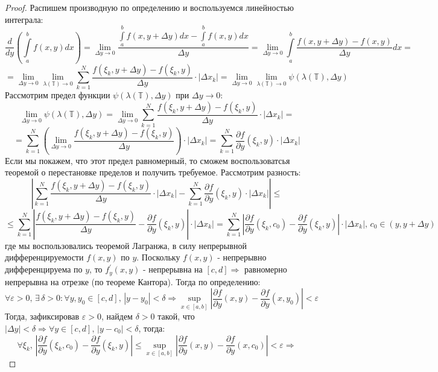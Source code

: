 \documentclass[12pt]{article}
\newcommand{\MTB}{\mathbb{T}}
\newcommand{\VE}{\varepsilon}
\theoremstyle{definition}
\newcommand{\ddsum}[2]{\displaystyle\sum\limits_{#1}^{#2}}
\newcommand{\ddint}[2]{\displaystyle\int\limits_{#1}^{#2}}
\begin{document}
\begin{proof}
	Распишем производную по определению и воспользуемся линейностью интеграла:
	$$
		\dfrac{d}{dy}\left(\ddint{a}{b}f(x,y)dx\right) = \lim\limits_{\Delta y \to 0}\dfrac{\ddint{a}{b}f(x, y + \Delta y)dx - \ddint{a}{b}f(x,y)dx}{\Delta y} = \lim\limits_{\Delta y \to 0}\ddint{a}{b}\dfrac{f(x, y + \Delta y) - f(x,y)}{\Delta y} dx =
	$$
	$$
		= \lim\limits_{\Delta y \to 0}\lim\limits_{\lambda(\MTB)\to 0}\ddsum{k = 1}{N}\dfrac{f(\xi_k, y + \Delta y) - f(\xi_k, y)}{\Delta y}{\cdot}|\Delta x_k| = \lim\limits_{\Delta y \to 0}\lim\limits_{\lambda(\MTB)\to 0}\psi\left(\lambda(\MTB) , \Delta y\right)
	$$
	Рассмотрим предел функции $\psi(\lambda(\MTB) , \Delta y)$ при $\Delta y \to 0$:
	$$
		\lim\limits_{\Delta y \to 0}\psi(\lambda(\MTB) , \Delta y) = \lim\limits_{\Delta y \to 0}\ddsum{k = 1}{N}\dfrac{f(\xi_k, y + \Delta y) - f(\xi_k, y)}{\Delta y}{\cdot}|\Delta x_k| = 
	$$
	$$
		= \ddsum{k = 1}{N}\left(\lim\limits_{\Delta y \to 0}\dfrac{f(\xi_k, y + \Delta y) - f(\xi_k, y)}{\Delta y} \right){\cdot}|\Delta x_k| = \ddsum{k = 1}{N}\dfrac{\partial f}{\partial y}(\xi_k, y){\cdot}|\Delta x_k|
	$$
	Если мы покажем, что этот предел равномерный, то сможем воспользоватсья теоремой о перестановке пределов и получить требуемое. Рассмотрим разность:
	$$
		\left|\ddsum{k = 1}{N}\dfrac{f(\xi_k, y+\Delta y) - f(\xi_k, y)}{\Delta y}{\cdot}|\Delta x_k| - \ddsum{k = 1}{N}\dfrac{\partial f}{\partial y}(\xi_k, y){\cdot}|\Delta x_k|\right| \leq 
	$$
	$$
		\leq \ddsum{k = 1}{N}\left|\dfrac{f(\xi_k, y+\Delta y) - f(\xi_k, y)}{\Delta y} - \dfrac{\partial f}{\partial y}(\xi_k, y)\right|{\cdot}|\Delta x_k| = \ddsum{k = 1}{N}\left| \dfrac{\partial f}{\partial y}(\xi_k, c_0) - \dfrac{\partial f}{\partial y}(\xi_k, y)  \right|{\cdot}|\Delta x_k|, \, c_0 \in (y, y + \Delta y)
	$$
	где мы воспользовались теоремой Лагранжа, в силу непрерывной дифференцируемости $f(x,y)$ по $y$. Поскольку $f(x,y)$ - непрерывно дифференцируема по $y$, то $f_y^\prime(x,y)$ - непрерывна на $[c,d] \Rightarrow$ равномерно непрерывна на отрезке (по теореме Кантора). Тогда по определению:
	$$
		\forall \VE > 0, \, \exists \, \delta > 0 \colon \forall y,y_0 \in [c,d], \, |y - y_0| < \delta \Rightarrow \sup\limits_{x \in [a,b]}\left|\dfrac{\partial f}{\partial y}(x, y) - \dfrac{\partial f}{\partial y}(x, y_0) \right| < \VE
	$$
	Тогда, зафиксировав $\VE > 0$, найдем $\delta > 0$ такой, что $|\Delta y | < \delta \Rightarrow \forall y \in [c,d], \, |y - c_0| < \delta$, тогда:
	$$
		\forall \xi_k, \, \left| \dfrac{\partial f}{\partial y}(\xi_k, c_0) - \dfrac{\partial f}{\partial y}(\xi_k, y)  \right| \leq \sup\limits_{x \in [a,b]}\left|\dfrac{\partial f}{\partial y}(x, y) - \dfrac{\partial f}{\partial y}(x, c_0) \right| < \VE \Rightarrow
$$
\end{proof}
\end{document}
